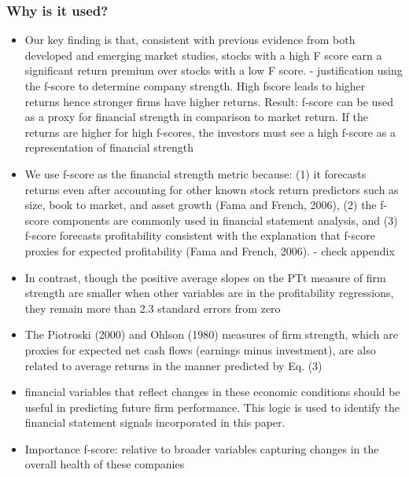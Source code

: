 \documentclass[12pt]{article}
\begin{document}
    \subsubsection{Why is it used?}

        \begin{itemize}

            \item Our key finding is that, consistent with previous evidence from both developed and emerging market studies, stocks with a high F score earn a significant return premium over stocks with a low F score. \citep{Hyde2014} - justification using the f-score to determine company strength. High fscore leads to higher returns hence stronger firms have higher returns. Result: f-score can be used as a proxy for financial strength in comparison to market return. If the returns are higher for high f-scores, the investors must see a high f-score as a representation of financial strength

            \item We use f-score as the financial strength metric because: (1) it forecasts returns even after accounting for other known stock return predictors such as size, book to market, and asset growth (Fama and French, 2006), (2) the f-score components are commonly used in financial statement analysis, and (3) f-score forecasts profitability consistent with the explanation that f-score proxies for expected profitability (Fama and French, 2006).\citep{Choi2012} - check appendix 

            \item In contrast, though the positive average slopes on the PTt measure of firm strength are smaller when other variables are in the profitability regressions, they remain more than 2.3 standard errors from zero \citep{Fama2006}

            \item The Piotroski (2000) and Ohlson (1980) measures of firm strength, which are proxies for expected net cash flows (earnings minus investment), are also related to average returns in the manner predicted by Eq. (3) \citep{Fama2006}

            \item financial variables that reflect changes in these economic conditions should be useful in predicting future firm performance. This logic is used to identify the financial statement signals incorporated in this paper. \citep{Piotroski2000}

            \item Importance f-score: relative to broader variables capturing changes in the overall health of these companies \citep{Piotroski2000}


\end{itemize}
\end{document}
